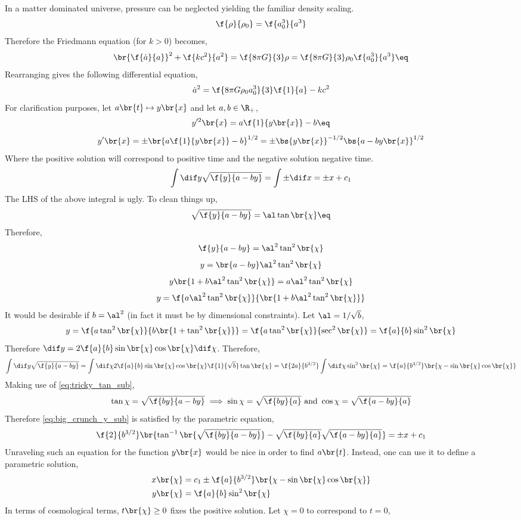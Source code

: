 \documentclass{article}
\begin{document}
In a matter dominated universe, pressure can be neglected yielding the familiar density scaling.
\[ \f{\rho}{\rho_0} = \f{a_0^3}{a^3} \]
Therefore the Friedmann equation (for $k >0$) becomes,
\[ \br{\f{\dot a}{a}}^2 + \f{kc^2}{a^2} = \f{8 \pi G}{3} \rho = \f{8 \pi G}{3} \rho_0\f{a_0^3}{a^3} \eq \label{eq:friedmann_alt}\]
Rearranging gives the following differential equation,
\[ \dot a^2  = \f{8 \pi G\rho_0a_0^3}{3} \f{1}{a} - kc^2 \]
For clarification purposes, let $a\br{t} \mapsto y\br{x}$ and let $a,b \in \R_{+}$,
\[ y'^2\br{x} = a \f{1}{y\br{x}} - b \eq \label{eq:big_crunch_y_sub}\]
\[ y'\br{x} = \pm\br{a \f{1}{y\br{x}} - b}^{1/2} = \pm\bs{y\br{x}}^{-1/2}\bs{a - b y\br{x}}^{1/2} \]
Where the positive solution will correspond to positive time and the negative solution negative time.
\[ \int \dif y \sqrt{\f{y}{a - b y}} = \int \pm \dif x = \pm x + c_1  \]
The LHS of the above integral is ugly. To clean things up,
\[ \sqrt{\f{y}{a - b y}} = \al \tan \br{\chi} \eq \label{eq:tricky_tan_sub}\]
Therefore,
\[ \f{y}{a - b y} = \al^2 \tan^2 \br{\chi} \]
\[ y = \br{a - b y}\al^2 \tan^2 \br{\chi} \]
\[ y\br{1 + b\al^2 \tan^2 \br{\chi}} = a\al^2 \tan^2 \br{\chi} \]
\[ y = \f{a\al^2 \tan^2 \br{\chi}}{\br{1 + b\al^2 \tan^2 \br{\chi}}} \]
It would be desirable if $b = \al^2$ (in fact it must be by dimensional constraints). Let $\al = 1/\sqrt{b}$,
\[ y = \f{a \tan^2 \br{\chi}}{b\br{1 + \tan^2 \br{\chi}}} = \f{a\tan^2 \br{\chi}}{\sec^2 \br{\chi}} = \f{a}{b} \sin^2\br{\chi} \]
Therefore $\dif y = 2\f{a}{b} \sin\br{\chi}\cos\br{\chi} \dif \chi$. Therefore,
\[  \int \dif y \sqrt{\f{y}{a - b y}} = \int \dif \chi 2\f{a}{b} \sin\br{\chi}\cos\br{\chi} \f{1}{\sqrt{b}} \tan \br{\chi} = \f{2a}{b^{3/2}}\int \dif \chi \sin^2\br{\chi} = \f{a}{b^{3/2}} \br{\chi - \sin\br{\chi}\cos\br{\chi}} \]
Making use of \cref{eq:tricky_tan_sub},
\[ \tan \chi = \sqrt{\f{by}{a - b y}} \implies \sin \chi = \sqrt{\f{by}{a}} \text{ and } \cos \chi = \sqrt{\f{a - by}{a}} \]
Therefore \cref{eq:big_crunch_y_sub} is satisfied by the parametric equation,
\[ \f{2}{b^{3/2}} \br{\tan^{-1}\br{\sqrt{\f{by}{a - b y}}} - \sqrt{\f{by}{a}}\sqrt{\f{a - by}{a}}} = \pm x + c_1 \]
Unraveling such an equation for the function $y\br{x}$ would be nice in order to find $a\br{t}$. Instead, one can use it to define a parametric solution,
\begin{align*}
x\br{\chi} &= c_1 \pm \f{a}{b^{3/2}} \br{\chi - \sin\br{\chi}\cos\br{\chi}}  \\
y\br{\chi} &= \f{a}{b} \sin^2\br{\chi}
\end{align*}
In terms of cosmological terms, $t\br{\chi} \geq 0$ fixes the positive solution. Let $\chi = 0$ to correspond to $t = 0$,
\end{document}
